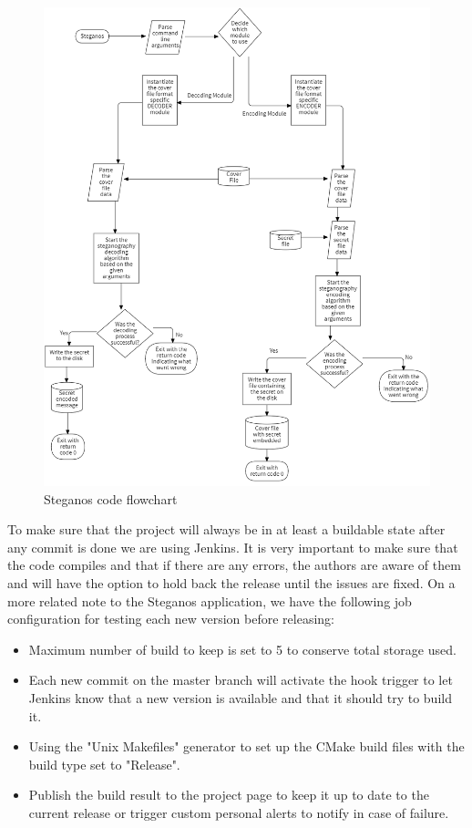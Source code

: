 \begin{figure}[H]
    \centering
    \includegraphics[width=15cm,keepaspectratio]{pics/application_chapter/flowchart}
    \caption{Steganos code flowchart}
    \label{flowchart-code}
\end{figure}


To make sure that the project will always be in at least a buildable state after any commit is done we are using Jenkins. It is very important to make sure that the code compiles and that if there are any errors, the authors are aware of them and will have the option to hold back the release until the issues are fixed. On a more related note to the Steganos application, we have the following job configuration for testing each new version before releasing:
\begin{itemize}
	\item Maximum number of build to keep is set to 5 to conserve total storage used.
	\item Each new commit on the master branch will activate the hook trigger to let Jenkins know that a new version is available and that it should try to build it.
	\item Using the "Unix Makefiles" generator to set up the CMake build files with the build type set to "Release".
	\item Publish the build result to the project page to keep it up to date to the current release or trigger custom personal alerts to notify in case of failure.
\end{itemize}

